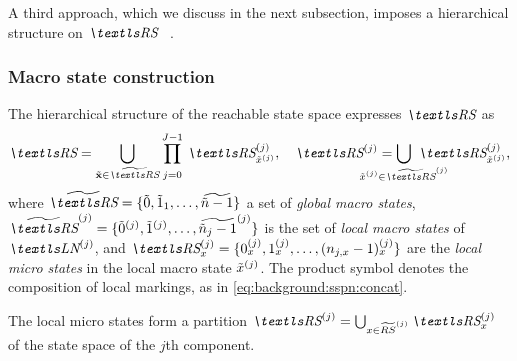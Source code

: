 A third approach, which we discuss in the next subsection, imposes a
hierarchical structure on $\RS$~%
\citep{DBLP:conf/cpe/BauseBK98,%
  DBLP:journals/sigmetrics/BuchholzK98,%
  DBLP:journals/tse/Buchholz99}.

\subsubsection{Macro state construction}

The hierarchical structure of the reachable state space expresses
$\RS$ as
\begin{equation}
  \RS = \bigcup_{\macro{\vec{x}} \in \Macro{\RS}}
  \prod_{\vphantom{\Macro{\RS}}j = 0}^{J - 1}
  \, \loc{\RS}{j}_{\loc{\macro{x}}{j}}, \quad
  \loc{\RS}{j} = \bigcup_{\mathclap{\loc{\macro{x}}{j} \in \loc{\Macro{\RS}}{j}}}
  \,\, \loc{\RS}{j}_{\loc{\macro{x}}{j}} \text,
\end{equation}
where
$\Macro{\RS} = \{\macro{0}, \macro{1}_1, \ldots, \Macro{\macro{n} - 1}
\}$
a set of \emph{global macro states},
$\loc{\Macro{\RS}}{j} = \{\loc{\macro{0}}{j}, \loc{\macro{1}}{j},
\ldots, \loc{\Macro{\macro{n}_j - 1}}{j} \}$ is the set of \emph{local
macro states} of $\LN{j}$, and $\loc{\RS}{j}_{x} = \{\loc{0}{j}_x,
\loc{1}{j}_x, \ldots, \loc{(n_{j, x} - 1)}{j}_x \}$ are the
\emph{local micro states} in the local macro state
$\tilde{x}^{(j)}$. The product symbol denotes the composition of
local markings, as in \vref{eq:background:sspn:concat}.

The local micro states form a partition
$\loc{\RS}{j} = \bigcup_{x \in \loc{\Macro{RS}}{j}} \loc{\RS}{j}_{x}$
of the state space of the $j$th  component.

